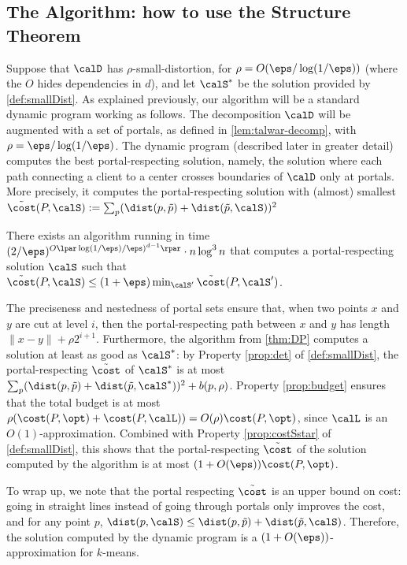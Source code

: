 \subsection{The Algorithm: how to use the Structure Theorem}\label{sec:algo}

Suppose that $\calD$ has $\rho$-small-distortion, for $\rho = O(\eps / \log(1/\eps))$ (where the $O$ hides dependencies in $d$), and let $\calS^*$ be the solution provided by \cref{def:smallDist}. 
As explained previously, our algorithm will be a standard dynamic program working as follows. The decomposition $\calD$ will be augmented with a set of portals, as defined in \cref{lem:talwar-decomp}, with $\rho = \eps / \log(1/\eps)$. 
The dynamic program (described later in greater detail) computes the best portal-respecting solution, namely, the solution where each path connecting a client to a center crosses boundaries of $\calD$ only at portals. More precisely, it computes the portal-respecting solution with (almost) smallest $\tilde{\cost}(P, \calS) := \sum_p (\dist(p, \tilde p) + \dist(\tilde p, \calS))^2$

\begin{theorem}\label{thm:DP}
    There exists an algorithm running in time $(2/\eps)^{O\lpar \log(1/\eps)/\eps)^{d-1}\rpar} \cdot n \log^3 n$ that computes a portal-respecting solution $\calS$ such that $\tilde {\cost}(P, \calS) \leq (1+\eps) \min_{\calS'} \tilde{\cost}(P, \calS')$.
\end{theorem}

The preciseness and nestedness of portal sets ensure that, when two points $x$ and $y$ are cut at level $i$, then the portal-respecting path between $x$ and $y$ has length $\|x-y\| + \rho 2^{i+1}$. 
Furthermore, the algorithm from \cref{thm:DP} computes a solution at least as good as $\calS^*$: by Property \ref{prop:det} of \cref{def:smallDist}, the portal-respecting $\tilde{\cost}$ of $\calS^*$ is at most $\sum_p (\dist(p, \tilde p) + \dist(\tilde p, \calS^*))^2 + b(p, \rho)$.  Property \ref{prop:budget} ensures that the total budget is at most $\rho (\cost(P, \opt) + \cost(P, \calL)) = O(\rho) \cost(P, \opt)$, since $\calL$ is an $O(1)$-approximation. 
Combined with Property \ref{prop:costSstar} of \cref{def:smallDist}, this shows that the portal-respecting $\tilde{\cost}$ of the solution computed by the algorithm is at most $(1+O(\eps))\cost(P, \opt)$. 

To wrap up, we note that the portal respecting $\tilde{\cost}$ is an upper bound on cost: going in straight lines instead of going through portals only improves the cost, and for any point $p$, $\dist(p, \calS) \leq \dist(p, \tilde p) + \dist(\tilde p, \calS)$. Therefore, the solution computed by the dynamic program is a $(1+O(\eps))$-approximation for $k$-means.

